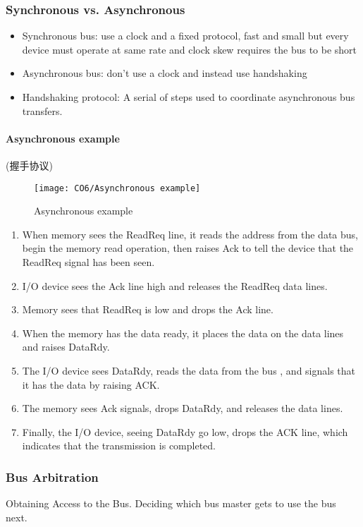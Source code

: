 \subsubsection{Synchronous vs. Asynchronous}
\begin{itemize}\small
    \item Synchronous bus: use a clock and a fixed protocol, fast and small but every device must operate at same rate and clock skew requires the bus to be short
    \item Asynchronous bus: don't use a clock and instead use handshaking
    \item Handshaking protocol: A serial of steps used to coordinate asynchronous bus transfers.
\end{itemize}

\paragraph{Asynchronous example}
(握手协议)
\begin{figure}[!htb]
    \centering
    \texttt{[image: CO6/Asynchronous example]}
    \caption{Asynchronous example}
\end{figure}
\begin{enumerate}\small
    \item When memory sees the ReadReq line, it reads the address from the data bus, begin the memory read operation, then raises Ack to tell the device that the ReadReq signal has been seen.
    \item I/O device sees the Ack line high and releases the ReadReq data lines.
    \item Memory sees that ReadReq is low and drops the Ack line.
    \item When the memory has the data ready, it places the data on the data lines and raises DataRdy.
    \item The I/O device sees DataRdy, reads the data from the bus , and signals that it has the data by raising ACK.
    \item The memory sees Ack signals, drops DataRdy, and releases the data lines.
    \item Finally, the I/O device, seeing DataRdy go low, drops the ACK line, which indicates that the transmission is completed.
\end{enumerate}


\subsubsection{Bus Arbitration}
Obtaining Access to the Bus. Deciding which bus master gets to use the bus next. 

